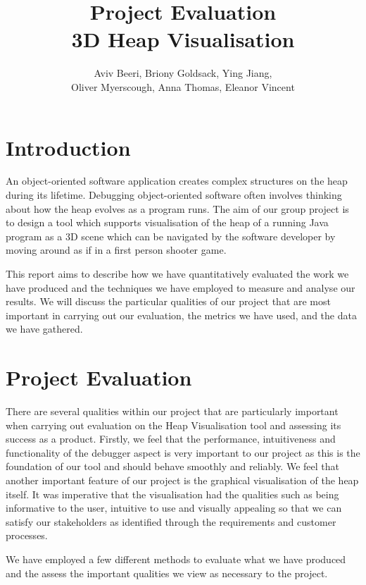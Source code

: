 \documentclass[10pt, a4paper]{article}
\begin{document}
\title{Project Evaluation
\\ 3D Heap Visualisation}
\author{Aviv Beeri, Briony Goldsack, Ying Jiang, 
\\ Oliver Myerscough, Anna Thomas, Eleanor Vincent}
\maketitle


\section{Introduction}

An object-oriented software application creates complex structures on the heap during its lifetime. Debugging object-oriented software often involves thinking about how the heap evolves as a program runs. The aim of our group project is to design a tool which supports visualisation of the heap of a running Java program as a 3D scene which can be navigated by the software developer by moving around as if in a first person shooter game.

This report aims to describe how we have quantitatively evaluated the work we have produced and the techniques we have employed to measure and analyse our results. We will discuss the particular qualities of our project that are most important in carrying out our evaluation, the metrics we have used, and the data we have gathered. 

\section{Project Evaluation}

There are several qualities within our project that are particularly important when carrying out evaluation on the Heap Visualisation tool and assessing its success as a product. Firstly, we feel that the performance, intuitiveness and functionality of the debugger aspect is very important to our project as this is the foundation of our tool and should behave smoothly and reliably. We feel that another important feature of our project is the graphical visualisation of the heap itself. It was imperative that the visualisation had the qualities such as being informative to the user, intuitive to use and visually appealing so that we can satisfy our stakeholders as identified through the requirements and customer processes. 

We have employed a few different methods to evaluate what we have produced and the assess the important qualities we view as necessary to the project. 
\end{document}
